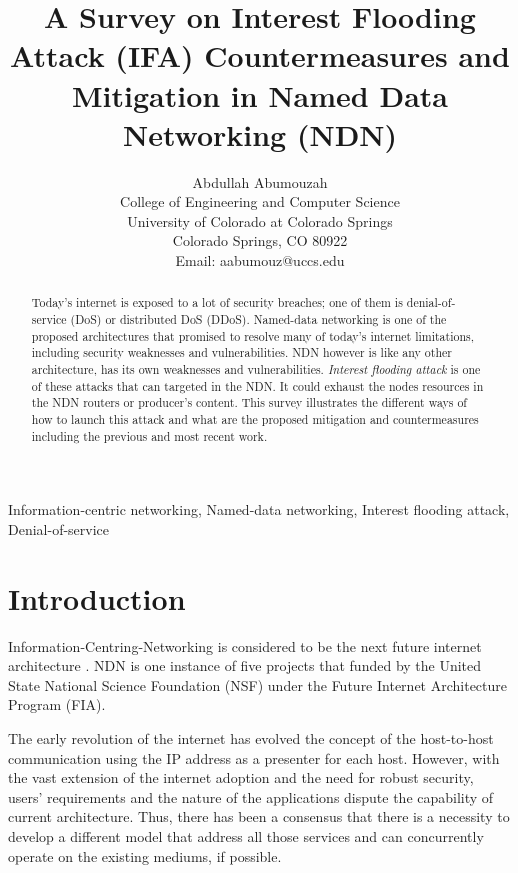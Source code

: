 \documentclass[conference]{IEEEtran}
\begin{document}
\title{A Survey on Interest Flooding Attack (IFA) Countermeasures and Mitigation in Named Data Networking (NDN)}

\author{Abdullah Abumouzah\\
College of Engineering and Computer Science\\
University of Colorado at Colorado Springs\\
Colorado Springs, CO 80922\\
Email: aabumouz@uccs.edu}

\maketitle

\begin{abstract}
Today's internet is exposed to a lot of security breaches; one of them is denial-of-service (DoS) or distributed DoS (DDoS). Named-data networking is one of the proposed architectures that promised to resolve many of today's internet limitations, including security weaknesses and vulnerabilities. NDN however is like any other architecture, has its own weaknesses and vulnerabilities. \textit{Interest flooding attack} is one of these attacks that can targeted in the NDN. It could exhaust the nodes resources in the NDN routers or producer's content. This survey illustrates the different ways of how to launch this attack and what are the proposed mitigation and countermeasures including the previous and most recent work.   

\end{abstract}

\begin{IEEEkeywords}
Information-centric networking, Named-data networking, Interest flooding attack, Denial-of-service
\end{IEEEkeywords}

\section{Introduction}
Information-Centring-Networking is considered to be the next future internet architecture \cite{6231276}. NDN is one instance of five projects that funded by the United State National Science Foundation (NSF) under the Future Internet Architecture Program (FIA).

The early revolution of the internet has evolved the concept of the host-to-host communication using the IP address as a presenter for each host. However, with the vast extension of the internet adoption and the need for robust security, users’ requirements and the nature of the applications dispute the capability of current architecture. Thus, there has been a consensus that there is a necessity to develop a different model that address all those services and can concurrently operate on the existing mediums, if possible.  
\end{document}
